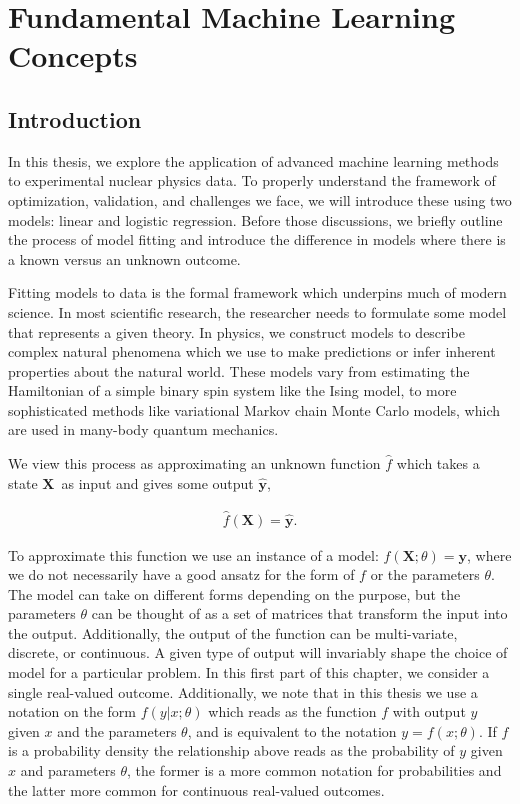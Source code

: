 \chapter{Fundamental Machine Learning Concepts}\label{chap:fundament}
\section{Introduction}\label{sec:fundament_intro}

In this thesis, we explore the application of advanced machine learning methods to experimental nuclear physics data. To properly understand the framework of optimization, validation, and challenges we face, we will introduce these using two models: linear and logistic regression. Before those discussions, we briefly outline the process of model fitting and introduce the difference in models where there is a known versus an unknown outcome.

Fitting models to data is the formal framework which underpins much of modern science. In most scientific research, the researcher needs to formulate some model that represents a given theory. In physics, we construct models to describe complex natural phenomena which we use to make predictions or infer inherent properties about the natural world. These models vary from estimating the Hamiltonian of a simple binary spin system like the Ising model, to more sophisticated methods like variational Markov chain Monte Carlo models, which are used in many-body quantum mechanics.

We view this process as approximating an unknown function $\hat{f}$ which takes a state $\boldsymbol{X}$ as input and gives some output $\boldsymbol{\hat{y}}$,  
 
 \begin{align}
 \hat{f}(\boldsymbol{X}) = \boldsymbol{\hat{y}}.
 \end{align}

\noindent To approximate this function we use an instance of a model: $f(\boldsymbol{X}; \theta) = \boldsymbol{y}$, where we do not necessarily have a good ansatz for the form of $f$ or the parameters $\theta$. The model can take on different forms depending on the purpose, but the parameters $\theta$ can be thought of as a set of matrices that transform the input into the output. Additionally, the output of the function can be multi-variate, discrete, or continuous. A given type of output will invariably shape the choice of model for a particular problem. In this first part of this chapter, we consider a single real-valued outcome. Additionally, we note  that in this thesis we use a notation on the form $f(y | x; \theta )$ which reads as the function $f$ with output $y$ given $x$ and the parameters $\theta$, and is equivalent to the notation $y = f(x; \theta)$. If $f$ is a probability density the relationship above reads as the probability of $y$ given $x$ and parameters $\theta$, the former is a more common notation for probabilities and the latter more common for continuous real-valued outcomes. 

